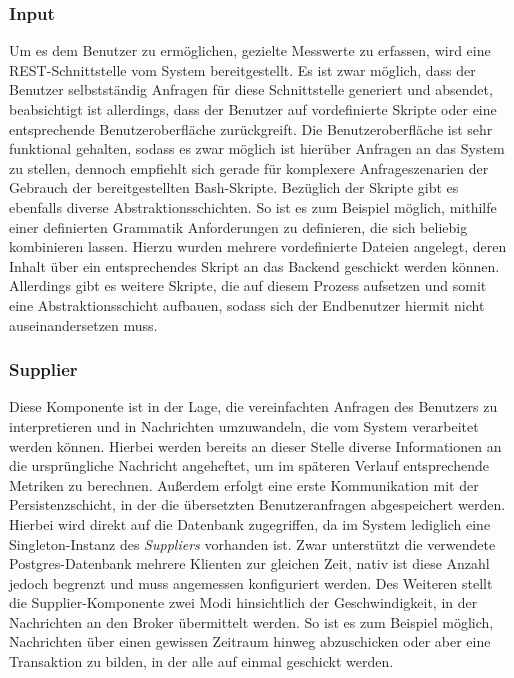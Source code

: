 \subsubsection{Input \checkmark}
Um es dem Benutzer zu ermöglichen, gezielte Messwerte zu erfassen, wird eine REST-Schnittstelle vom System bereitgestellt. Es ist zwar möglich, dass der Benutzer selbstständig Anfragen für diese Schnittstelle generiert und absendet, beabsichtigt ist allerdings, dass der Benutzer auf vordefinierte Skripte oder eine entsprechende Benutzeroberfläche zurückgreift. Die Benutzeroberfläche ist sehr funktional gehalten, sodass es zwar möglich ist hierüber Anfragen an das System zu stellen, dennoch empfiehlt sich gerade für komplexere Anfrageszenarien der Gebrauch der bereitgestellten Bash-Skripte. Bezüglich der Skripte gibt es ebenfalls diverse Abstraktionsschichten. So ist es zum Beispiel möglich, mithilfe einer definierten Grammatik Anforderungen zu definieren, die sich beliebig kombinieren lassen. Hierzu wurden mehrere vordefinierte Dateien angelegt, deren Inhalt über ein entsprechendes Skript an das Backend geschickt werden können. Allerdings gibt es weitere Skripte, die auf diesem Prozess aufsetzen und somit eine Abstraktionsschicht aufbauen, sodass sich der Endbenutzer hiermit nicht auseinandersetzen muss. 


\subsubsection{Supplier \checkmark}
Diese Komponente ist in der Lage, die vereinfachten Anfragen des Benutzers zu interpretieren und in Nachrichten umzuwandeln, die vom System verarbeitet werden können. Hierbei werden bereits an dieser Stelle diverse Informationen an die ursprüngliche Nachricht angeheftet, um im späteren Verlauf entsprechende Metriken zu berechnen. Außerdem erfolgt eine erste Kommunikation mit der Persistenzschicht, in der die übersetzten Benutzeranfragen abgespeichert werden. Hierbei wird direkt auf die Datenbank zugegriffen, da im System lediglich eine Singleton-Instanz des \emph{Suppliers} vorhanden ist. Zwar unterstützt die verwendete Postgres-Datenbank mehrere Klienten zur gleichen Zeit, nativ ist diese Anzahl jedoch begrenzt und muss angemessen konfiguriert werden. Des Weiteren stellt die Supplier-Komponente zwei Modi hinsichtlich der Geschwindigkeit, in der Nachrichten an den Broker übermittelt werden. So ist es zum Beispiel möglich, Nachrichten über einen gewissen Zeitraum hinweg abzuschicken oder aber eine Transaktion zu bilden, in der alle auf einmal geschickt werden.


